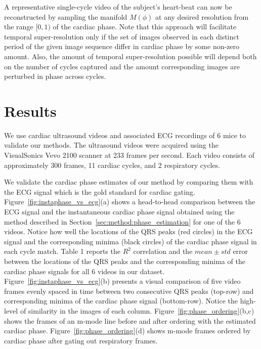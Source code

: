 \documentclass[runningheads,a4paper]{llncs}
\begin{document}
	A representative single-cycle video of the subject's heart-beat can now be reconstructed by sampling the manifold $M(\phi)$ at any desired resolution from the range $[0, 1)$ of the cardiac phase. Note that this approach will facilitate temporal super-resolution only if the set of images observed in each distinct period of the given image sequence differ in cardiac phase by some non-zero amount. Also, the amount of temporal super-resolution possible will depend both on the number of cycles captured and the amount corresponding images are perturbed in phase across cycles. 
\vspace{-0.3cm}
\section{Results}
\label{sec:results}
%
We use cardiac ultrasound videos and associated ECG recordings of 6 mice to validate our methods. The ultrasound videos were acquired using the VisualSonics Vevo 2100 scanner at 233 frames per second. Each video consists of approximately 300 frames, 11 cardiac cycles, and 2 respiratory cycles.

	We validate the cardiac phase estimates of our method by comparing them with the ECG signal which is the gold standard for cardiac gating. Figure~\ref{fig:instaphase_vs_ecg}(a) shows a head-to-head comparison between the ECG signal and the instantaneous cardiac phase signal obtained using the method described in Section~\ref{sec:method:phase_estimation} for one of the 6 videos. Notice how well the locations of the  QRS peaks (red circles) in the ECG signal and the corresponding minima (black circles) of the cardiac phase signal in each cycle match. Table 1 reports the $R^2$ correlation and the $mean \pm std$ error between the locations of the QRS peaks and the corresponding minima of the cardiac phase signals for all 6 videos in our dataset. Figure~\ref{fig:instaphase_vs_ecg}(b) presents a visual comparison of five video frames evenly spaced in time between two consecutive QRS peaks (top-row) and corresponding minima of the cardiac phase signal (bottom-row). Notice the high-level of similarity in the images of each column.  Figure~\ref{fig:phase_ordering}(b,c) shows the frames of an m-mode line before and after ordering with the estimated cardiac phase. Figure~\ref{fig:phase_ordering}(d) shows m-mode frames ordered by cardiac phase after gating out respiratory frames. 
	
\end{document}

